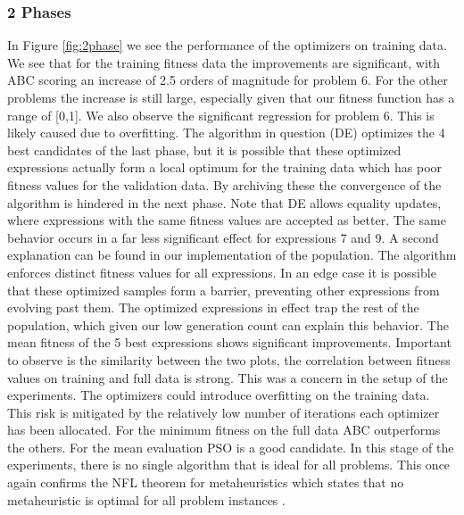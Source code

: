 \subsubsection{2 Phases}
In Figure \ref{fig:2phase} we see the performance of the optimizers on training data. 
We see that for the training fitness data the improvements are significant, with ABC scoring an increase of 2.5 orders of magnitude for problem 6. For the other problems the increase is still large, especially given that our fitness function has a range of [0,1].
We also observe the significant regression for problem 6. This is likely caused due to overfitting. The algorithm in question (DE) optimizes the 4 best candidates of the last phase, but it is possible that these optimized expressions actually form a local optimum for the training data which has poor fitness values for the validation data. By archiving these the convergence of the algorithm is hindered in the next phase. Note that DE allows equality updates, where expressions with the same fitness values are accepted as better. The same behavior occurs in a far less significant effect for expressions 7 and 9. A second explanation can be found in our implementation of the population. The algorithm enforces distinct fitness values for all expressions. In an edge case it is possible that these optimized samples form a barrier, preventing other expressions from evolving past them. The optimized expressions in effect trap the rest of the population, which given our low generation count can explain this behavior. The mean fitness of the 5 best expressions shows significant improvements. Important to observe is the similarity between the two plots, the correlation between fitness values on training and full data is strong. This was a concern in the setup of the experiments. The optimizers could introduce overfitting on the training data. This risk is mitigated by the relatively low number of iterations each optimizer has been allocated. For the minimum fitness on the full data ABC outperforms the others. For the mean evaluation PSO is a good candidate. In this stage of the experiments, there is no single algorithm that is ideal for all problems. This once again confirms the NFL theorem for metaheuristics which states that no metaheuristic is optimal for all problem instances \cite{NFL}.
